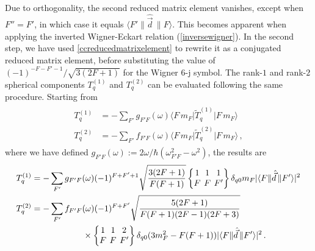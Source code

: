 \documentclass[../Thesis-IJspeert.tex]{subfiles}
\begin{document}
Due to orthogonality, the second reduced matrix element vanishes, except when $F''=F'$, in which case it equals $\langle{F'}\| \hat{\vec{d}} \, \|{F}\rangle$. This becomes apparent when applying the inverted Wigner-Eckart relation (\autoref{inversewigner}). In the second step, we have used \autoref{ccreducedmatrixelement} to rewrite it as a conjugated reduced matrix element, before substituting the value of $(-1)^{-F-F'-1}/\sqrt{3(2F+1)}$ for the Wigner 6-j symbol. The rank-$1$ and rank-$2$ spherical components $T^{(1)}_q$ and $T^{(2)}_q$ can be evaluated following the same procedure. Starting from
\begin{align}
\begin{split}
T^{(1)}_q&=-\sum_{F'} g_{F'F}(\omega) \langle F\, m_F \vert {\tilde{T}^{(1)}_q}  \vert F\, m_F \rangle\\ T^{(2)}_q&=-\sum_{F'} f_{F'F}(\omega) \langle F\, m_F \vert {\tilde{T}^{(2)}_q}  \vert F\, m_F \rangle\,,
\end{split}
\end{align}
where we have defined $g_{F'F}(\omega):= {2\omega }/{\hbar (\omega_{F' F}^2-\omega^2)}$, the results are
\begin{align}
\begin{split}
T^{(1)}_q&=-\sum_{F'} g_{F'F}(\omega) (-1)^{F+F'+1} \sqrt{\frac{3(2F+1)}{F(F+1)}} \tj{1}{1}{1}{F}{F}{F'} \delta_{q0} m_F  \lvert \langle{F}\| \hat{\vec{d}} \, \|{F'}\rangle\rvert^2\\ T^{(2)}_q&=-\sum_{F'} f_{F'F}(\omega) (-1)^{F+F'} \sqrt{\frac{5(2F+1)}{F(F+1)(2F-1)(2F+3)}}\\ &\hspace{6em} \times \tj{1}{1}{2}{F}{F}{F'} \delta_{q0} (3m_F^2-F(F+1)) \lvert \langle{F}\| \hat{\vec{d}} \, \|{F'}\rangle\rvert^2\,.
\end{split}
\end{align}
\end{document}
